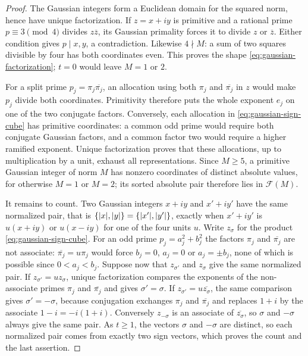 \begin{proof}
The Gaussian integers form a Euclidean domain for the squared norm,
hence have unique factorization. If $z=x+iy$ is primitive and a rational
prime $p\equiv3\pmod4$ divides $z\overline z$, its Gaussian primality
forces it to divide $z$ or $\overline z$. Either condition gives
$p\mid x,y$, a contradiction. Likewise $4\nmid M$: a sum of two
squares divisible by four has both coordinates even. This proves the
shape \eqref{eq:gaussian-factorization}; $t=0$ would leave $M=1$ or $2$.

For a split prime $p_j=\pi_j\overline{\pi_j}$, an allocation using both
$\pi_j$ and $\overline{\pi_j}$ in $z$ would make $p_j$ divide both
coordinates. Primitivity therefore puts the whole exponent $e_j$ on
one of the two conjugate factors. Conversely, each allocation in
\eqref{eq:gaussian-sign-cube} has primitive coordinates: a common odd
prime would require both conjugate Gaussian factors, and a common factor
two would require a higher ramified exponent. Unique factorization proves
that these allocations, up to multiplication by a unit, exhaust all
representations. Since $M\geqslant5$, a primitive Gaussian integer of norm $M$
has nonzero coordinates of distinct absolute values, for otherwise $M=1$ or
$M=2$; its sorted absolute pair therefore lies in $\mathcal F(M)$.

It remains to count. Two Gaussian integers $x+iy$ and $x'+iy'$ have the
same normalized pair, that is $\{\lvert x\rvert,\lvert y\rvert\}=\{\lvert x'\rvert,\lvert y'\rvert\}$,
exactly when $x'+iy'$ is $u(x+iy)$ or $u(x-iy)$ for one of the four units
$u$. Write $z_\sigma$ for the product \eqref{eq:gaussian-sign-cube}. For an
odd prime $p_j=a_j^2+b_j^2$ the factors $\pi_j$ and $\overline{\pi_j}$ are
not associate: $\overline{\pi_j}=u\pi_j$ would force $b_j=0$, $a_j=0$ or
$a_j=\pm b_j$, none of which is possible since $0<a_j<b_j$. Suppose now that
$z_{\sigma'}$ and $z_\sigma$ give the same normalized pair. If
$z_{\sigma'}=uz_\sigma$, unique factorization compares the exponents of the
non-associate primes $\pi_j$ and $\overline{\pi_j}$ and gives $\sigma'=\sigma$.
If $z_{\sigma'}=u\overline{z_\sigma}$, the same comparison gives
$\sigma'=-\sigma$, because conjugation exchanges $\pi_j$ and
$\overline{\pi_j}$ and replaces $1+i$ by the associate $1-i=-i(1+i)$.
Conversely $z_{-\sigma}$ is an associate of $\overline{z_\sigma}$, so $\sigma$
and $-\sigma$ always give the same pair. As $t\geqslant1$, the vectors
$\sigma$ and $-\sigma$ are distinct, so each normalized pair comes from
exactly two sign vectors, which proves the count and the last assertion.
\end{proof}

